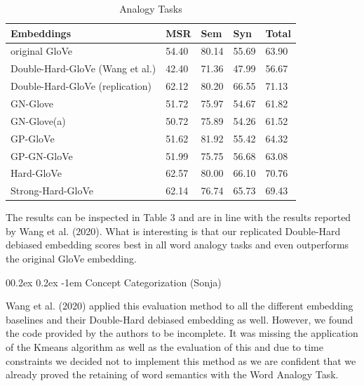 \documentclass[
  english,
  man,floatsintext]{apa6}
\makeatletter
\let\oldparagraph\paragraph
\renewcommand{\paragraph}[1]{\oldparagraph{#1}\mbox{}}
\renewcommand{\paragraph}{\@startsection{paragraph}{4}{\parindent}%
  {0\baselineskip \@plus 0.2ex \@minus 0.2ex}%
  {-1em}%
  {\normalfont\normalsize\bfseries\itshape\typesectitle}}
\makeatother
\begin{document}
\begin{table}[tbp]

\begin{center}
\begin{threeparttable}

\caption{\label{tab:table 3}Analogy Tasks}

\begin{tabular}{lllll}
\toprule
Embeddings & MSR & Sem & Syn & Total\\
\midrule
original GloVe & 54.40 & 80.14 & 55.69 & 63.90\\
Double-Hard-GloVe (Wang et al.) & 42.40 & 71.36 & 47.99 & 56.67\\
Double-Hard-GloVe (replication) & 62.12 & 80.20 & 66.55 & 71.13\\
GN-Glove & 51.72 & 75.97 & 54.67 & 61.82\\
GN-Glove(a) & 50.72 & 75.89 & 54.26 & 61.52\\
GP-GloVe & 51.62 & 81.92 & 55.42 & 64.32\\
GP-GN-GloVe & 51.99 & 75.75 & 56.68 & 63.08\\
Hard-GloVe & 62.57 & 80.00 & 66.10 & 70.76\\
Strong-Hard-GloVe & 62.14 & 76.74 & 65.73 & 69.43\\
\bottomrule
\end{tabular}

\end{threeparttable}
\end{center}

\end{table}

The results can be inspected in Table 3 and are in line with the results reported by Wang et al. (2020). What is interesting is that our replicated Double-Hard debiased embedding scores best in all word analogy tasks and even outperforms the original GloVe embedding.

\hypertarget{concept-categorization-sonja}{%
\paragraph{Concept Categorization (Sonja)}\label{concept-categorization-sonja}}

Wang et al. (2020) applied this evaluation method to all the different embedding baselines and their Double-Hard debiased embedding as well. However, we found the code provided by the authors to be incomplete. It was missing the application of the Kmeans algorithm as well as the evaluation of this and due to time constraints we decided not to implement this method as we are confident that we already proved the retaining of word semantics with the Word Analogy Task.
\end{document}
